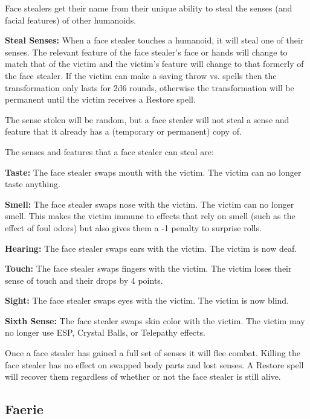 \begin{multicols*}{2}
Face stealers get their name from their unique ability to steal the senses (and facial features) of other humanoids.

\textbf{Steal Senses:} When a face stealer touches a humanoid, it will steal one of their senses. The relevant feature of the face stealer’s face or hands will change to match that of the victim and the victim’s feature will change to that formerly of the face stealer. If the victim can make a saving throw vs. spells then the transformation only lasts for 2d6 rounds, otherwise the transformation will be permanent until the victim receives a Restore spell.

The sense stolen will be random, but a face stealer will not steal a sense and feature that it already has a (temporary or permanent) copy of.

The senses and features that a face stealer can steal are:

\textbf{Taste:} The face stealer swaps mouth with the victim. The victim can no longer taste anything.

\textbf{Smell:} The face stealer swaps nose with the victim. The victim can no longer smell. This makes the victim immune to effects that rely on smell (such as the effect of foul odors) but also gives them a -1 penalty to surprise rolls.

\textbf{Hearing:} The face stealer swaps ears with the victim. The victim is now deaf.

\textbf{Touch:} The face stealer swaps fingers with the victim. The victim loses their sense of touch and their  drops by 4 points.

\textbf{Sight:} The face stealer swaps eyes with the victim. The victim is now blind.

\textbf{Sixth Sense:} The face stealer swaps skin color with the victim. The victim may no longer use ESP, Crystal Balls, or Telepathy effects.

Once a face stealer has gained a full set of senses it will flee combat. Killing the face stealer has no effect on swapped body parts and lost senses. A Restore spell will recover them regardless of whether or not the face stealer is still alive.

\subsection{Faerie}
\end{multicols*}
